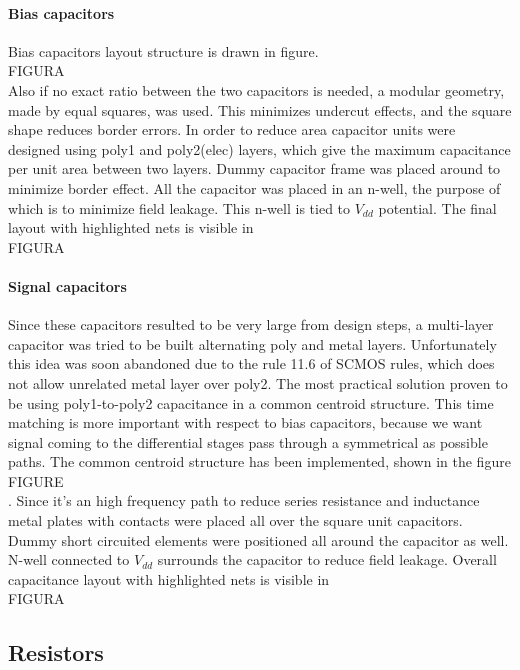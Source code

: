 \paragraph{Bias capacitors}
Bias capacitors layout structure is drawn in figure. \\FIGURA\\ Also if no exact ratio between the two capacitors is needed, a modular geometry, made by equal squares, was used. This minimizes undercut effects, and the square shape reduces border errors. In order to reduce area capacitor units were designed using poly1 and poly2(elec) layers, which give the maximum capacitance per unit area between two layers. Dummy capacitor frame was placed around to minimize border effect. All the capacitor was placed in an n-well, the purpose of which is to minimize field leakage. This n-well is tied to \(V_{dd}\) potential. The final layout with highlighted nets is visible in \\FIGURA\\ 

\paragraph{Signal capacitors}
Since these capacitors resulted to be very large from design steps, a multi-layer capacitor was tried to be built alternating poly and metal layers. Unfortunately this idea was soon abandoned due to the rule 11.6 of SCMOS rules, which does not allow unrelated metal layer over poly2. The most practical solution proven to be using poly1-to-poly2 capacitance in a common centroid structure. This time matching is more important with respect to bias capacitors, because we want signal coming to the differential stages pass through a symmetrical as possible paths.
The common centroid structure has been implemented, shown in the figure \\FIGURE\\. Since it's an high frequency path to reduce series resistance and inductance metal plates with contacts were placed all over the square unit capacitors. Dummy short circuited elements were positioned all around the capacitor as well. N-well connected to \(V_{dd}\) surrounds the capacitor to reduce field leakage. Overall capacitance layout with highlighted nets is visible in \\FIGURA\\

\subsection{Resistors}
